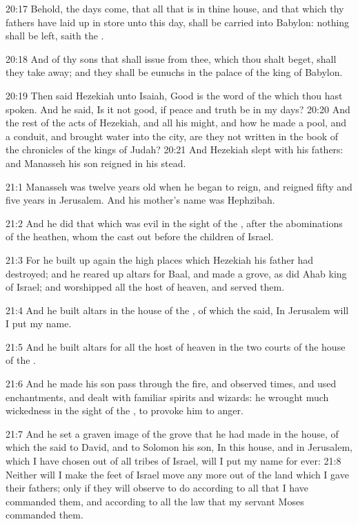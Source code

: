 20:17 Behold, the days come, that all that is in thine house, and that which thy fathers have laid up in store unto this day, shall be carried into Babylon: nothing shall be left, saith the \LORD.

20:18 And of thy sons that shall issue from thee, which thou shalt beget, shall they take away; and they shall be eunuchs in the palace of the king of Babylon.

20:19 Then said Hezekiah unto Isaiah, Good is the word of the \LORD which thou hast spoken. And he said, Is it not good, if peace and truth be in my days?  20:20 And the rest of the acts of Hezekiah, and all his might, and how he made a pool, and a conduit, and brought water into the city, are they not written in the book of the chronicles of the kings of Judah?  20:21 And Hezekiah slept with his fathers: and Manasseh his son reigned in his stead.

21:1 Manasseh was twelve years old when he began to reign, and reigned fifty and five years in Jerusalem. And his mother's name was Hephzibah.

21:2 And he did that which was evil in the sight of the \LORD, after the abominations of the heathen, whom the \LORD cast out before the children of Israel.

21:3 For he built up again the high places which Hezekiah his father had destroyed; and he reared up altars for Baal, and made a grove, as did Ahab king of Israel; and worshipped all the host of heaven, and served them.

21:4 And he built altars in the house of the \LORD, of which the \LORD said, In Jerusalem will I put my name.

21:5 And he built altars for all the host of heaven in the two courts of the house of the \LORD.

21:6 And he made his son pass through the fire, and observed times, and used enchantments, and dealt with familiar spirits and wizards: he wrought much wickedness in the sight of the \LORD, to provoke him to anger.

21:7 And he set a graven image of the grove that he had made in the house, of which the \LORD said to David, and to Solomon his son, In this house, and in Jerusalem, which I have chosen out of all tribes of Israel, will I put my name for ever: 21:8 Neither will I make the feet of Israel move any more out of the land which I gave their fathers; only if they will observe to do according to all that I have commanded them, and according to all the law that my servant Moses commanded them.

